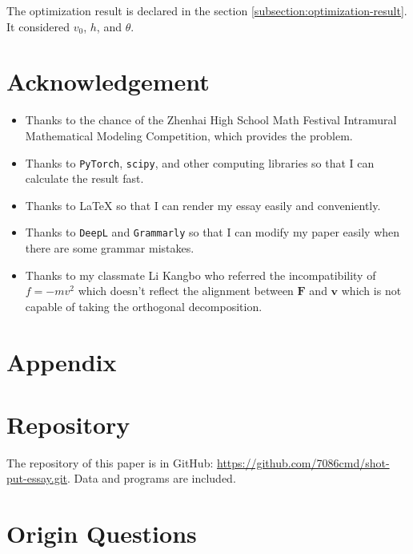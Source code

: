 \documentclass{article}
\begin{document}
The optimization result is declared in the section \ref{subsection:optimization-result}. It considered $v_0$, $h$, and $\theta$.

\section{Acknowledgement}

\label{section:acknowledgement}

\begin{itemize}
    \item Thanks to the chance of the Zhenhai High School Math Festival Intramural Mathematical Modeling Competition, which provides the problem.
    \item Thanks to \texttt{PyTorch}, \texttt{scipy}, and other computing libraries so that I can calculate the result fast.
    \item Thanks to \LaTeX{} so that I can render my essay easily and conveniently.
    \item Thanks to \texttt{DeepL} and \texttt{Grammarly} so that I can modify my paper easily when there are some grammar mistakes.
    \item Thanks to my classmate Li Kangbo who referred the incompatibility of $f=-mv^2$ which doesn't reflect the alignment between $\boldsymbol{F}$ and $\boldsymbol{v}$ which is not capable of taking the orthogonal decomposition.
\end{itemize}

\nocite{*}

{}


\section*{Appendix}

\appendix

\section{Repository}

\label{appendix:repository}

The repository of this paper is in GitHub: \url{https://github.com/7086cmd/shot-put-essay.git}. Data and programs are included.

\section{Origin Questions}
\end{document}
